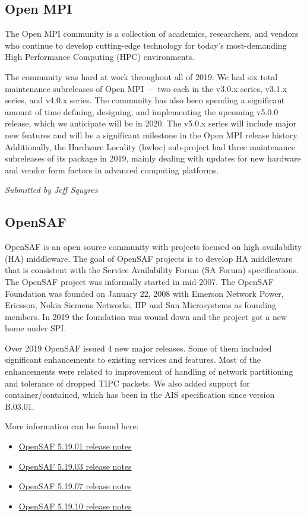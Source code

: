 \documentclass[a4paper]{report}
\begin{document}
\subsection{Open MPI}

The Open MPI community is a collection of academics, researchers, and
vendors who continue to develop cutting-edge technology for today's
most-demanding High Performance Computing (HPC) environments.

The community was hard at work throughout all of 2019.  We had six total
maintenance subreleases of Open MPI --- two each in the v3.0.x series,
v3.1.x series, and v4.0.x series.  The community has also been spending
a significant amount of time defining, designing, and implementing the
upcoming v5.0.0 release, which we anticipate will be in 2020.  The
v5.0.x series will include major new features and will be a significant
milestone in the Open MPI release history.  Additionally, the Hardware
Locality (hwloc) sub-project had three maintenance subreleases of its
package in 2019, mainly dealing with updates for new hardware and vendor
form factors in advanced computing platforms.

{\em Submitted by Jeff Squyres}

\subsection{OpenSAF}

OpenSAF is an open source community with projects focused on high
availability (HA) middleware.  The goal of OpenSAF projects is to
develop HA middleware that is consistent with the Service Availability
Forum (SA Forum) specifications.  The OpenSAF project was informally
started in mid-2007.  The OpenSAF Foundation was founded on January 22,
2008 with Emerson Network Power, Ericsson, Nokia Siemens Networks, HP
and Sun Microsystems as founding members.  In 2019 the foundation was
wound down and the project got a new home under SPI.

Over 2019 OpenSAF issued 4 new major releases.  Some of them included
significant enhancements to existing services and features.  Most of the
enhancements were related to improvement of handling of network
partitioning and tolerance of dropped TIPC packets. We also added
support for container/contained, which has been in the AIS specification
since version B.03.01.

More information can be found here:

\begin{itemize}

\item \href{https://sourceforge.net/p/opensaf/wiki/NEWS-5.19.01/}{OpenSAF 5.19.01 release notes}
\item \href{https://sourceforge.net/p/opensaf/wiki/NEWS-5.19.03/}{OpenSAF 5.19.03 release notes}
\item \href{https://sourceforge.net/p/opensaf/wiki/NEWS-5.19.07/}{OpenSAF 5.19.07 release notes}
\item \href{https://sourceforge.net/p/opensaf/wiki/NEWS-5.19.10/}{OpenSAF 5.19.10 release notes}

\end{itemize}
\end{document}
